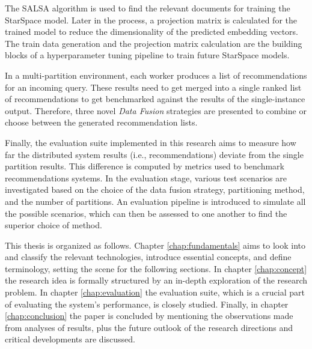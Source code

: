 The SALSA algorithm is used to find the relevant documents for training the StarSpace model. Later in the process, a projection matrix is calculated for the trained model to reduce the dimensionality of the predicted embedding vectors. The train data generation and the projection matrix calculation are the building blocks of a hyperparameter tuning pipeline to train future StarSpace models.


In a multi-partition environment, each worker produces a list of recommendations for an incoming query. These results need to get merged into a single ranked list of recommendations to get benchmarked against the results of the single-instance output. Therefore, three novel \emph{Data Fusion} strategies are presented to combine or choose between the generated recommendation lists.


Finally, the evaluation suite implemented in this research aims to measure how far the distributed system results (i.e., recommendations) deviate from the single partition results. This difference is computed by metrics used to benchmark recommendations systems. In the evaluation stage, various test scenarios are investigated based on the choice of the data fusion strategy, partitioning method, and the number of partitions. An evaluation pipeline is introduced to simulate all the possible scenarios, which can then be assessed to one another to find the superior choice of method.


This thesis is organized as follows. Chapter \ref{chap:fundamentals} aims to look into and classify the relevant technologies, introduce essential concepts, and define terminology, setting the scene for the following sections. In chapter \ref{chap:concept} the research idea is formally structured by an in-depth exploration of the research problem. In chapter \ref{chap:evaluation} the evaluation suite, which is a crucial part of evaluating the system's performance, is closely studied. Finally, in chapter \ref{chap:conclusion} the paper is concluded by mentioning the observations made from analyses of results, plus the future outlook of the research directions and critical developments are discussed.
